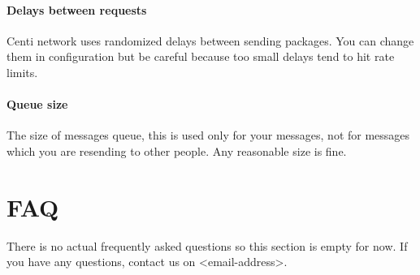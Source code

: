 \documentclass{article}
\begin{document}
		\paragraph{Delays between requests}
		Centi network uses randomized delays between sending packages.
		You can change them in configuration but be careful because too small delays tend to hit rate limits.

		\paragraph{Queue size}
		The size of messages queue, this is used only for your messages,
		not for messages which you are resending to other people.
		Any reasonable size is fine.
\section{FAQ}
	There is no actual frequently asked questions so this section is empty for now.
	If you have any questions, contact us on <email-address>.
\end{document}
